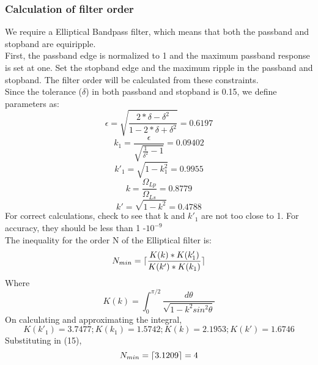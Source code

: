 \documentclass[12pt]{article}
\DeclarePairedDelimiter\ceil{\lceil}{\rceil}
\begin{document}
\subsubsection{Calculation of filter order}
We require a Elliptical Bandpass filter, which means that both the passband and stopband are equiripple.
\\First, the passband edge is normalized to 1 and the maximum passband response is set at one. Set the
stopband edge and the maximum ripple in the passband and stopband. The filter order will be calculated from
these constraints.
\\Since the tolerance ($\delta$) in both passband and stopband is 0.15, we define parameters as:
\begin{equation}
    \epsilon = \sqrt{\frac{2*\delta-\delta^2}{1-2*\delta+\delta^2}} = 0.6197
\end{equation}
\begin{equation}
    k_1=\frac{\epsilon}{\sqrt{\frac{1}{\delta^2}-1}}=0.09402
\end{equation}
\begin{equation}
    k'_1=\sqrt{1-k_1^2}=0.9955
\end{equation}
\begin{equation}
    k=\frac{\Omega_{Lp}}{\Omega_{Ls}}=0.8779
\end{equation}
\begin{equation}
    k'=\sqrt{1-k^2}=0.4788
\end{equation}
For correct calculations, check to see that k and $k'_1$ are not too close to 1. For accuracy, they should be less
than 1 -$ 10^{-9}$
\\The inequality for the order N of the Elliptical filter is:
\begin{equation}
    N_{min}=\ceil{\frac{K(k)*K(k'_1)}{K(k')*K(k_1)}} 
\end{equation}
Where 
\begin{equation}
    K(k)=\int^{\pi/2}_0 \frac{d\theta}{\sqrt{1-k^2sin^2\theta}}
\end{equation}
On calculating and approximating the integral,
\begin{equation}
    K(k'_1)=3.7477;  K(k_1)=1.5742; K(k)=2.1953; K(k')=1.6746
\end{equation}
Substituting in (15),
\begin{equation}
    N_{min}=\ceil{3.1209}=4
\end{equation}
\end{document}
